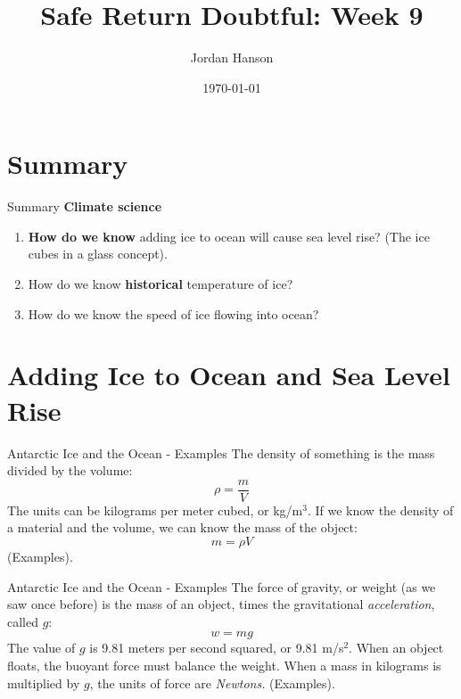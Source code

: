\documentclass{beamer}
\title{Safe Return Doubtful: Week 9}
\date{\today}
\author{Jordan Hanson}
\institute{Whittier College Department of Physics and Astronomy}
\begin{document}
\maketitle

\section{Summary}

\begin{frame}{Summary}
\textbf{Climate science}
\begin{enumerate}
\item \textbf{How do we know} adding ice to ocean will cause sea level rise? (The ice cubes in a glass concept).
\item How do we know \textbf{historical} temperature of ice?
\item How do we know the speed of ice flowing into ocean?
\end{enumerate}
\end{frame}

\section{Adding Ice to Ocean and Sea Level Rise}

\begin{frame}{Antarctic Ice and the Ocean - Examples}
The density of something is the mass divided by the volume:
\begin{equation}
\rho = \frac{m}{V}
\end{equation}
The units can be kilograms per meter cubed, or kg/m$^{3}$.  If we know the density of a material and the volume, we can know the mass of the object:
\begin{equation}
m = \rho V
\end{equation}
(Examples).
\end{frame}

\begin{frame}{Antarctic Ice and the Ocean - Examples}
The force of gravity, or weight (as we saw once before) is the mass of an object, times the gravitational \textit{acceleration}, called $g$:
\begin{equation}
w = mg
\end{equation}
The value of $g$ is 9.81 meters per second squared, or 9.81 m/s$^2$.  When an object floats, the buoyant force must balance the weight. When a mass in kilograms is multiplied by $g$, the units of force are \textit{Newtons.}  (Examples).
\end{frame}
\end{document}
